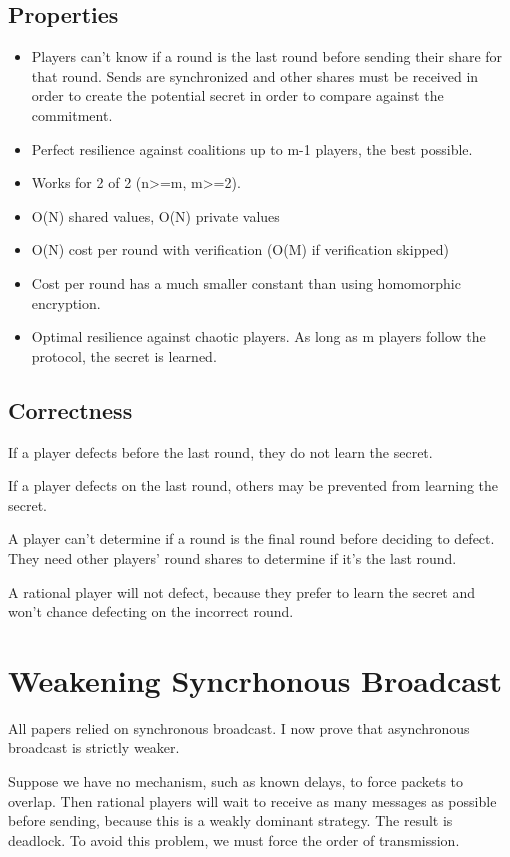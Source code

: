 \documentclass{article}
\begin{document}
\subsection{Properties}
\begin{itemize}
	\item Players can't know if a round is the last round before sending their share for that round.
	\subitem Sends are synchronized and other shares must be received in order to create the potential secret in order to compare against the commitment.
	\item Perfect resilience against coalitions up to m-1 players, the best possible.
	\item Works for 2 of 2 (n>=m, m>=2).
	\item O(N) shared values, O(N) private values
	\item O(N) cost per round with verification (O(M) if verification skipped)
	\item Cost per round has a much smaller constant than using homomorphic encryption.
	\item Optimal resilience against chaotic players. As long as m players follow the protocol, the secret is learned.
\end{itemize}

\subsection{Correctness}

If a player defects before the last round, they do not learn the secret.

If a player defects on the last round, others may be prevented from learning the secret.

A player can't determine if a round is the final round before deciding to defect. They need other players' round shares to determine if it's the last round.

A rational player will not defect, because they prefer to learn the secret and won't chance defecting on the incorrect round.

\section{Weakening Syncrhonous Broadcast}

All papers relied on synchronous broadcast. I now prove that asynchronous broadcast is strictly weaker.

Suppose we have no mechanism, such as known delays, to force packets to overlap. Then rational players will wait to receive as many messages as possible before sending, because this is a weakly dominant strategy. The result is deadlock. To avoid this problem, we must force the order of transmission.
\end{document}

